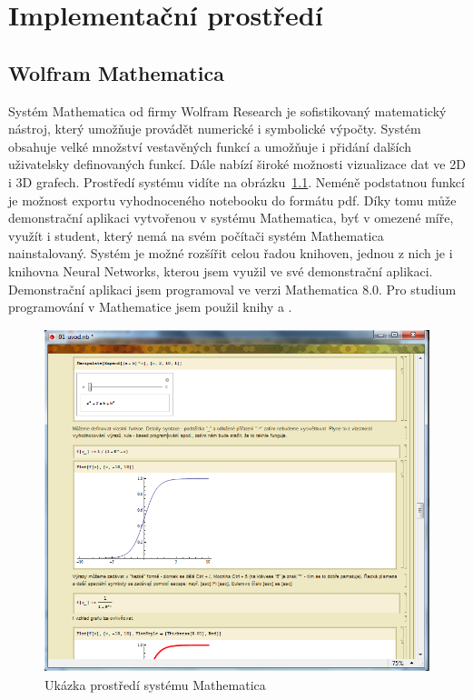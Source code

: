 \documentclass[11pt,twoside,a4paper]{book}
\begin{document}
\chapter{Implementační prostředí}
\section{Wolfram Mathematica}
Systém Mathematica od firmy Wolfram Research je sofistikovaný matematický nástroj, který umožňuje provádět numerické i symbolické výpočty. Systém obsahuje velké množství vestavěných funkcí a umožňuje i přidání dalších uživatelsky definovaných funkcí. Dále nabízí široké možnosti vizualizace dat ve 2D i 3D grafech. Prostředí systému vidíte na obrázku~\ref{fig:prostredi}. Neméně podstatnou funkcí je možnost exportu vyhodnoceného notebooku do formátu pdf. Díky tomu může demonstrační aplikaci vytvořenou v systému Mathematica, byť v omezené míře, využít i student, který nemá na svém počítači systém Mathematica nainstalovaný. Systém je možné rozšířit celou řadou knihoven, jednou z nich je i knihovna Neural Networks, kterou jsem využil ve své demonstrační aplikaci. Demonstrační aplikaci jsem programoval ve verzi Mathematica 8.0. Pro studium programování v Mathematice jsem použil knihy\cite{mathD} a \cite{mathP}.

\begin{figure}[!h]
\begin{center}
\includegraphics[height=10cm]{figures/ukazka01.png}
\caption{Ukázka prostředí systému Mathematica}
\label{fig:prostredi}
\end{center}
\end{figure}
\end{document}

